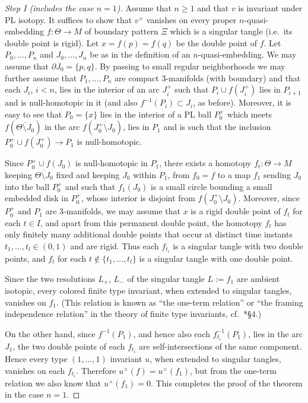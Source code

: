 \documentclass[a4paper,12pt,reqno,oneside]{amsart} %
\theoremstyle{plain}
\theoremstyle{definition}
\theoremstyle{named}
\def\x{\times}
\def\but{\setminus}
\renewcommand{\:}{\colon}
\begin{document}
\begin{proof}[Step I (includes the case $n=1$)]
Assume that $n\ge 1$ and that $v$ is invariant under PL isotopy.
It suffices to show that $v^\x$ vanishes on every proper $n$-quasi-embedding $f\:\Theta\to M$ of boundary pattern $\Xi$
which is a singular tangle (i.e.\ its double point is rigid).
Let $x=f(p)=f(q)$ be the double point of $f$.
Let $P_0,\dots,P_n$ and $J_0,\dots,J_n$ be as in the definition of an $n$-quasi-embedding.
We may assume that $\partial J_0=\{p,q\}$.
By passing to small regular neighborhoods we may further assume that $P_1,\dots,P_n$ are 
compact $3$-manifolds (with boundary) and that each $J_i$, $i<n$, lies in the interior of 
an arc $J_i^+$ such that $P_i\cup f(J_i^+)$ lies in $P_{i+1}$ and is null-homotopic in it 
(and also $f^{-1}(P_i)\subset J_i$, as before).
Moreover, it is easy to see that $P_0=\{x\}$ lies in the interior of a PL ball $P_0^+$ which 
meets $f(\overline{\Theta\but J_0})$ in the arc $f(\overline{J_0^+\but J_0})$, lies in $P_1$ and 
is such that the inclusion $P_0^+\cup f(J_0^+)\to P_1$ is null-homotopic.

Since $P_0^+\cup f(J_0)$ is null-homotopic in $P_1$, there exists a homotopy $f_t\:\Theta\to M$ 
keeping $\overline{\Theta\but J_0}$ fixed and keeping $J_0$ within $P_1$, from $f_0=f$ to a map $f_1$ 
sending $J_0$ into the ball $P_0^+$ and such that $f_1(J_0)$ is a small circle bounding a small 
embedded disk in $P_0^+$, whose interior is disjoint from $f(J_0^+\but J_0)$.
Moreover, since $P_0^+$ and $P_1$ are $3$-manifolds, we may assume that $x$ is a rigid 
double point of $f_t$ for each $t\in I$, and apart from this permanent double point, the homotopy $f_t$ 
has only finitely many additional double points that occur at distinct time instants 
$t_1,\dots,t_l\in (0,1)$ and are rigid.
Thus each $f_{t_i}$ is a singular tangle with two double points, and $f_t$ for each 
$t\notin\{t_1,\dots,t_l\}$ is a singular tangle with one double point.

Since the two resolutions $L_+$, $L_-$ of the singular tangle $L:=f_1$ are ambient isotopic, 
every colored finite type invariant, when extended to singular tangles, vanishes on $f_1$.
(This relation is known as ``the one-term relation'' or ``the framing independence relation''
in the theory of finite type invariants, cf.\ \cite{CDM}*{\S4}.)

On the other hand, since $f^{-1}(P_1)$, and hence also each $f_{t_i}^{-1}(P_1)$, lies in the arc $J_1$, 
the two double points of each $f_{t_i}$ are self-intersections of the same component.
Hence every type $(1,\dots,1)$ invariant $u$, when extended to singular tangles, vanishes on each $f_{t_i}$.
Therefore $u^\x(f)=u^\x(f_1)$, but from the one-term relation we also know that $u^\x(f_1)=0$.
This completes the proof of the theorem in the case $n=1$.
\end{proof}
\end{document}
